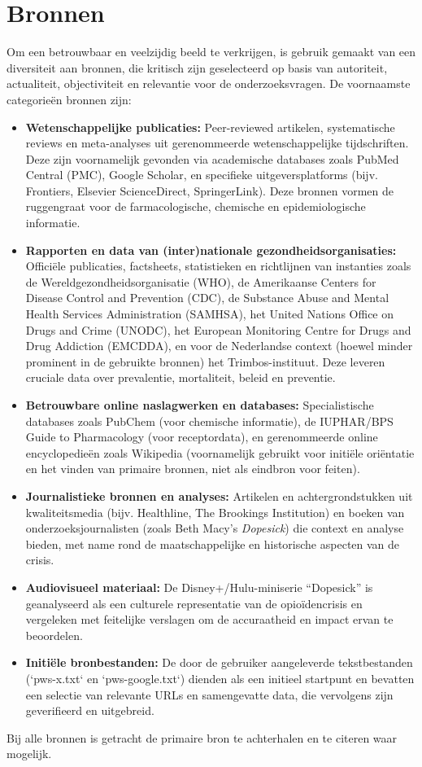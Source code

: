\documentclass[11pt, a4paper]{report} %
\begin{document}
\section{Bronnen}
Om een betrouwbaar en veelzijdig beeld te verkrijgen, is gebruik gemaakt van een diversiteit aan bronnen, die kritisch zijn geselecteerd op basis van autoriteit, actualiteit, objectiviteit en relevantie voor de onderzoeksvragen. De voornaamste categorieën bronnen zijn:
\begin{itemize}
    \item \textbf{Wetenschappelijke publicaties:} Peer-reviewed artikelen, systematische reviews en meta-analyses uit gerenommeerde wetenschappelijke tijdschriften. Deze zijn voornamelijk gevonden via academische databases zoals PubMed Central (PMC), Google Scholar, en specifieke uitgeversplatforms (bijv. Frontiers, Elsevier ScienceDirect, SpringerLink). Deze bronnen vormen de ruggengraat voor de farmacologische, chemische en epidemiologische informatie.
    \item \textbf{Rapporten en data van (inter)nationale gezondheidsorganisaties:} Officiële publicaties, factsheets, statistieken en richtlijnen van instanties zoals de Wereldgezondheidsorganisatie (WHO), de Amerikaanse Centers for Disease Control and Prevention (CDC), de Substance Abuse and Mental Health Services Administration (SAMHSA), het United Nations Office on Drugs and Crime (UNODC), het European Monitoring Centre for Drugs and Drug Addiction (EMCDDA), en voor de Nederlandse context (hoewel minder prominent in de gebruikte bronnen) het Trimbos-instituut. Deze leveren cruciale data over prevalentie, mortaliteit, beleid en preventie.
    \item \textbf{Betrouwbare online naslagwerken en databases:} Specialistische databases zoals PubChem (voor chemische informatie), de IUPHAR/BPS Guide to Pharmacology (voor receptordata), en gerenommeerde online encyclopedieën zoals Wikipedia (voornamelijk gebruikt voor initiële oriëntatie en het vinden van primaire bronnen, niet als eindbron voor feiten).
    \item \textbf{Journalistieke bronnen en analyses:} Artikelen en achtergrondstukken uit kwaliteitsmedia (bijv. Healthline, The Brookings Institution) en boeken van onderzoeksjournalisten (zoals Beth Macy's \textit{Dopesick}) die context en analyse bieden, met name rond de maatschappelijke en historische aspecten van de crisis.
    \item \textbf{Audiovisueel materiaal:} De Disney+/Hulu-miniserie \enquote{Dopesick} is geanalyseerd als een culturele representatie van de opioïdencrisis en vergeleken met feitelijke verslagen om de accuraatheid en impact ervan te beoordelen.
    \item \textbf{Initiële bronbestanden:} De door de gebruiker aangeleverde tekstbestanden (`pws-x.txt` en `pws-google.txt`) dienden als een initieel startpunt en bevatten een selectie van relevante URLs en samengevatte data, die vervolgens zijn geverifieerd en uitgebreid.
\end{itemize}
Bij alle bronnen is getracht de primaire bron te achterhalen en te citeren waar mogelijk.
\end{document}
